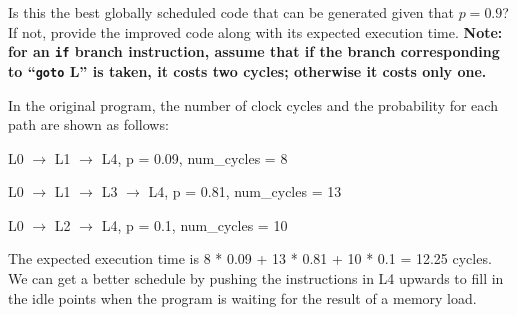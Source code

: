\begin{problem}
	\begin{enumerate}
		\item Is this the best globally scheduled code that can be generated given that $p = 0.9$? If
		not, provide the improved code along with its expected execution time. \textbf{Note: for an \texttt{if} branch instruction, assume that if the branch corresponding to ``\texttt{goto} L'' is taken, it costs two cycles; otherwise it costs only one.}
	{\color{red}
	
		In the original program, the number of clock cycles and the probability for each path
		are shown as follows:
		\item L0 $\rightarrow$ L1 $\rightarrow$ L4, p = 0.09, num\_cycles = 8
		\item L0 $\rightarrow$ L1 $\rightarrow$ L3 $\rightarrow$ L4, p = 0.81, num\_cycles = 13
		\item L0 $\rightarrow$ L2 $\rightarrow$ L4, p = 0.1, num\_cycles = 10

		The expected execution time is 8 * 0.09 + 13 * 0.81 + 10 * 0.1 = 12.25 cycles.
		We can get a better schedule by pushing the instructions in L4 upwards to fill in the
		idle points when the program is waiting for the result of a memory load.
		
		\begin{center}
\end{center}}
\end{enumerate}
\end{problem}
